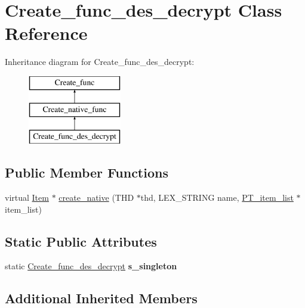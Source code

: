 \hypertarget{classCreate__func__des__decrypt}{}\section{Create\+\_\+func\+\_\+des\+\_\+decrypt Class Reference}
\label{classCreate__func__des__decrypt}
Inheritance diagram for Create\+\_\+func\+\_\+des\+\_\+decrypt\+:\begin{figure}[H]
\begin{center}
\leavevmode
\includegraphics[height=3.000000cm]{classCreate__func__des__decrypt}
\end{center}
\end{figure}
\subsection*{Public Member Functions}
\begin{DoxyCompactItemize}
\item 
virtual \mbox{\hyperlink{classItem}{Item}} $\ast$ \mbox{\hyperlink{classCreate__func__des__decrypt_a0801bef773e934745df2028becae038c}{create\+\_\+native}} (T\+HD $\ast$thd, L\+E\+X\+\_\+\+S\+T\+R\+I\+NG name, \mbox{\hyperlink{classPT__item__list}{P\+T\+\_\+item\+\_\+list}} $\ast$item\+\_\+list)
\end{DoxyCompactItemize}
\subsection*{Static Public Attributes}
\begin{DoxyCompactItemize}
\item 
\mbox{\label{classCreate__func__des__decrypt_a17d6c36dd4a552b966b721372cb0f50b}} 
static \mbox{\hyperlink{classCreate__func__des__decrypt}{Create\+\_\+func\+\_\+des\+\_\+decrypt}} {\bfseries s\+\_\+singleton}
\end{DoxyCompactItemize}
\subsection*{Additional Inherited Members}


